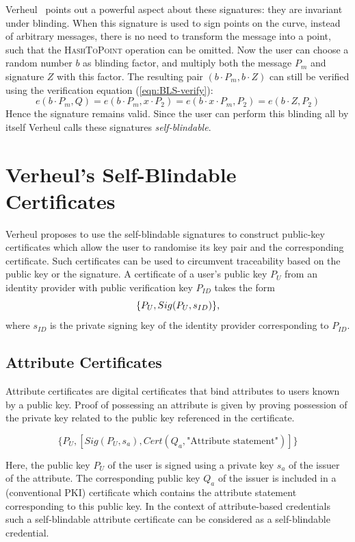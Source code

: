 Verheul~\cite{Verheul01} points out a powerful aspect about these signatures:
they are invariant under blinding. When this signature is used to sign points on
the curve,  instead of arbitrary messages, there is no need to transform the
message into a point, such that the \textsc{HashToPoint} operation can be
omitted. Now the user can choose a random number $b$ as blinding factor, and
multiply both the message $P_m$ and signature $Z$ with this factor. The
resulting pair $(b \cdot P_m, b \cdot Z)$ can still be verified using the
verification equation (\ref{eqn:BLS-verify}):
\begin{equation*}
  e(b \cdot P_m, Q)
  = e(b \cdot P_m, x \cdot P_2)
  = e(b \cdot x \cdot P_m, P_2)
  = e(b \cdot Z, P_2)
\end{equation*}
Hence the signature remains valid. Since the user can perform this blinding all
by itself Verheul calls these signatures \emph{self-blindable}.

\section{Verheul's Self-Blindable Certificates}

Verheul proposes to use the self-blindable signatures to construct public-key
certificates which allow the user to randomise its key pair and the
corresponding certificate. Such certificates can be used to circumvent
traceability based on the public key or the signature. A certificate of a user's
public key $P_U$ from an identity provider with public verification key $P_{ID}$
takes the form
\begin{equation*}
  \{ P_U, Sig(P_U, s_{ID}) \}\text,
\end{equation*}
where $s_{ID}$ is the private signing key of the identity provider corresponding
to $P_{ID}$.

\subsection{Attribute Certificates}

Attribute certificates are digital certificates that bind attributes to users
known by a public key. Proof of possessing an attribute is given by proving
possession of the private key related to the public key referenced in the
certificate.

$$\{P_U, [Sig(P_U, s_a), Cert(Q_a, \text{"Attribute statement"})]\}$$

Here, the public key $P_U$ of the user is signed using a private key $s_a$ of
the issuer of the attribute. The corresponding public key $Q_a$ of the issuer is
included in a (conventional PKI) certificate which contains the attribute
statement corresponding to this public key. In the context of attribute-based
credentials such a self-blindable attribute certificate can be considered as a
self-blindable credential.

